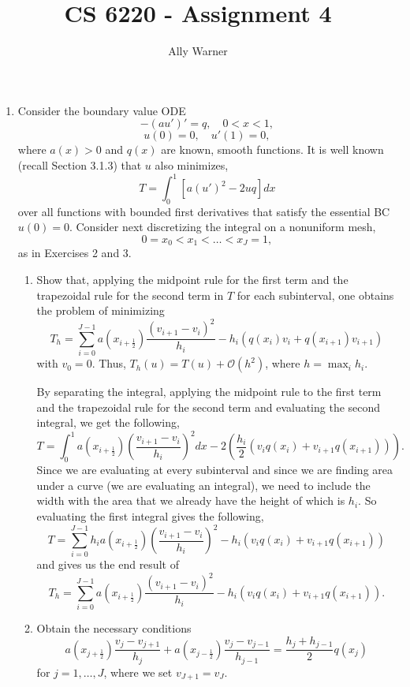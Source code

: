 \documentclass[11pt, oneside]{article}   	%
\title{CS 6220 - Assignment 4}
\author{Ally Warner}
\begin{document}
\maketitle

\begin{enumerate}

\item Consider the boundary value ODE
\[
-(au')' = q, \quad 0 < x < 1,
\]
\[
u(0) = 0, \quad u'(1) = 0,
\]
where $a(x) > 0$ and $q(x)$ are known, smooth functions. It is well known (recall Section 3.1.3) that $u$ also minimizes,
\[
T = \int_0^1 [a(u')^2 - 2uq]dx
\]
over all functions with bounded first derivatives that satisfy the essential BC $u(0) = 0$. Consider next discretizing the integral on a nonuniform mesh,
\[
0 = x_0 < x_1 < \dots < x_J = 1,
\]
as in Exercises 2 and 3.

\begin{enumerate}

\item Show that, applying the midpoint rule for the first term and the trapezoidal rule for the second term in $T$ for each subinterval, one obtains the problem of minimizing
\[
T_h = \sum_{i=0}^{J-1} a(x_{i + \frac{1}{2}}) \frac{(v_{i+1} - v_i)^2}{h_i} - h_i(q(x_i)v_i + q(x_{i+1}) v_{i+1})
\]
with $v_0 = 0$. Thus, $T_h(u) = T(u) + \mathcal{O}(h^2)$, where $h = \max_i h_i$.

\vspace{5mm}

By separating the integral, applying the midpoint rule to the first term and the trapezoidal rule for the second term and evaluating the second integral, we get the following,
\[
T = \int_0^1 a(x_{i+\frac{1}{2}}) \left(\frac{v_{i+1} - v_i}{h_i}\right)^2 dx - 2\left(\frac{h_i}{2} (v_i q(x_i) + v_{i+1} q(x_{i+1}))\right).
\]
Since we are evaluating at every subinterval and since we are finding area under a curve (we are evaluating an integral), we need to include the width with the area that we already have the height of which is $h_i$. So evaluating the first integral gives the following,
\[
T = \sum^{J-1}_{i = 0} h_i a(x_{i+\frac{1}{2}}) \left(\frac{v_{i+1} - v_i}{h_i}\right)^2 - h_i (v_i q(x_i) + v_{i+1} q(x_{i+1}))
\]
and gives us the end result of
\[
T_h = \sum^{J-1}_{i = 0} a(x_{i+\frac{1}{2}}) \frac{(v_{i+1} - v_i)^2}{h_i} - h_i (v_i q(x_i) + v_{i+1} q(x_{i+1})).
\] 

\item Obtain the necessary conditions
\[
a(x_{j+\frac{1}{2}}) \frac{v_j - v_{j+1}}{h_j} + a(x_{j - \frac{1}{2}}) \frac{v_j - v_{j-1}}{h_{j-1}} = \frac{h_j + h_{j-1}}{2} q(x_j)
\]
for $j = 1, \dots, J$, where we set $v_{J+1} = v_J$.


\end{enumerate}
\end{enumerate}
\end{document}

